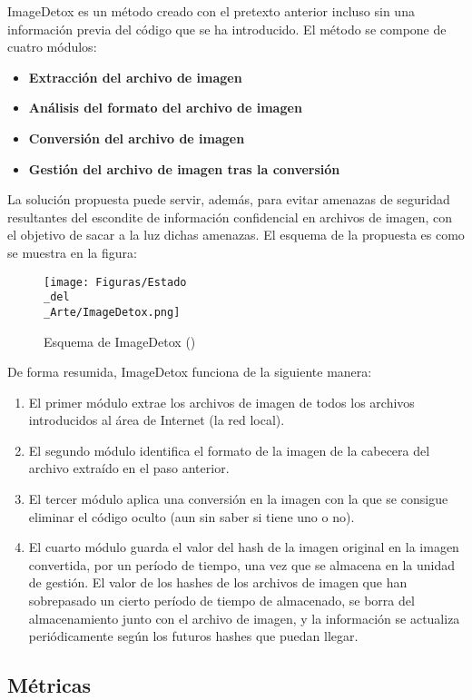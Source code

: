 ImageDetox es un método creado con el pretexto anterior incluso sin una información previa del código que se ha introducido. El método se compone de cuatro módulos:

\begin{itemize}
\item \textbf{Extracción del archivo de imagen}
\item \textbf{Análisis del formato del archivo de imagen}
\item \textbf{Conversión del archivo de imagen}
\item \textbf{Gestión del archivo de imagen tras la conversión}
\end{itemize}

La solución propuesta puede servir, además, para evitar amenazas de seguridad resultantes del escondite de información confidencial en archivos de imagen, con el objetivo de sacar a la luz dichas amenazas. El esquema de la propuesta es como se muestra en la figura:

\begin{figure}[H]
  \centering
  \texttt{[image: Figuras/Estado\\\_del\\\_Arte/ImageDetox.png]}
  \label{fig:ImageDetox}
  \caption{Esquema de ImageDetox (\cite{imagedetox})}
\end{figure}

De forma resumida, ImageDetox funciona de la siguiente manera:
\begin{enumerate}
\item  El primer módulo extrae los archivos de imagen de todos los archivos introducidos al área de Internet (la red local).
\item El segundo módulo identifica el formato de la imagen de la cabecera del archivo extraído en el paso anterior.
\item El tercer módulo aplica una conversión en la imagen con la que se consigue eliminar el código oculto (aun sin saber si tiene uno o no).
\item El cuarto módulo guarda el valor del hash de la imagen original en la imagen convertida, por un período de tiempo, una vez que se almacena en la unidad de gestión. El valor de los hashes de los archivos de imagen que han sobrepasado un cierto período de tiempo de almacenado, se borra del almacenamiento junto con el archivo de imagen, y la información se actualiza periódicamente según los futuros hashes que puedan llegar.
\end{enumerate}

\subsection{Métricas}

